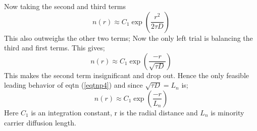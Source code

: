 Now taking the second and third terms
\begin{equation}\label{eqtnp8}
n(r) \approx C_1 \exp(\frac{r^2}{2 \tau D})
\end{equation}
This also outweighs the other two terms; Now the only left trial is balancing the third and first terms. This gives;
\begin{equation} \label{eqtnp9}
n(r) \approx C_1 \exp(\frac{-r}{\sqrt{\tau D}}) 
\end{equation}
This makes the second term insignificant and drop out. Hence the only feasible leading behavior of eqtn (\ref{eqtnp4}) and since $\sqrt{\tau D} = L_n$ is; 
\begin{equation} \label{eqtnp10}
n(r) \approx C_1 \exp({\frac{- r}{L_n}}) 
\end{equation}
Here $C_1$ is an integration constant, r is the radial distance and $L_n$ is minority carrier diffusion length.